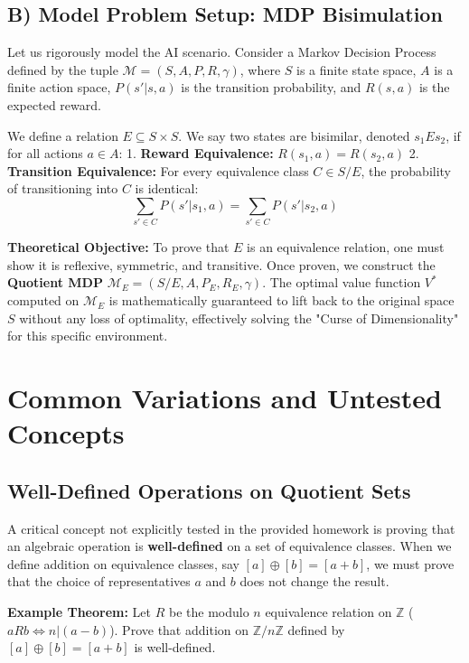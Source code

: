 \documentclass[11pt, a4paper]{article}
\theoremstyle{definition}
\theoremstyle{remark}
\newcommand{\Z}{\mathbb{Z}}
\begin{document}
\subsection{B) Model Problem Setup: MDP Bisimulation}
Let us rigorously model the AI scenario. Consider a Markov Decision Process defined by the tuple $\mathcal{M} = (S, A, P, R, \gamma)$, where $S$ is a finite state space, $A$ is a finite action space, $P(s'|s,a)$ is the transition probability, and $R(s,a)$ is the expected reward.

We define a relation $E \subseteq S \times S$. We say two states are bisimilar, denoted $s_1 E s_2$, if for all actions $a \in A$:
1. \textbf{Reward Equivalence:} $\displaystyle R(s_1, a) = R(s_2, a)$
2. \textbf{Transition Equivalence:} For every equivalence class $C \in S/E$, the probability of transitioning into $C$ is identical:
   \[ \displaystyle \sum_{s' \in C} P(s' | s_1, a) = \sum_{s' \in C} P(s' | s_2, a) \]

\textbf{Theoretical Objective:} To prove that $E$ is an equivalence relation, one must show it is reflexive, symmetric, and transitive. Once proven, we construct the \textbf{Quotient MDP} $\mathcal{M}_E = (S/E, A, P_E, R_E, \gamma)$. The optimal value function $V^*$ computed on $\mathcal{M}_E$ is mathematically guaranteed to lift back to the original space $S$ without any loss of optimality, effectively solving the "Curse of Dimensionality" for this specific environment.

\newpage

\section{Common Variations and Untested Concepts}

\subsection{Well-Defined Operations on Quotient Sets}
A critical concept not explicitly tested in the provided homework is proving that an algebraic operation is \textbf{well-defined} on a set of equivalence classes. When we define addition on equivalence classes, say $[a] \oplus [b] = [a+b]$, we must prove that the choice of representatives $a$ and $b$ does not change the result.

\textbf{Example Theorem:} Let $R$ be the modulo $n$ equivalence relation on $\Z$ ($a R b \iff n | (a-b)$). Prove that addition on $\Z/n\Z$ defined by $[a] \oplus [b] = [a+b]$ is well-defined.
\end{document}
